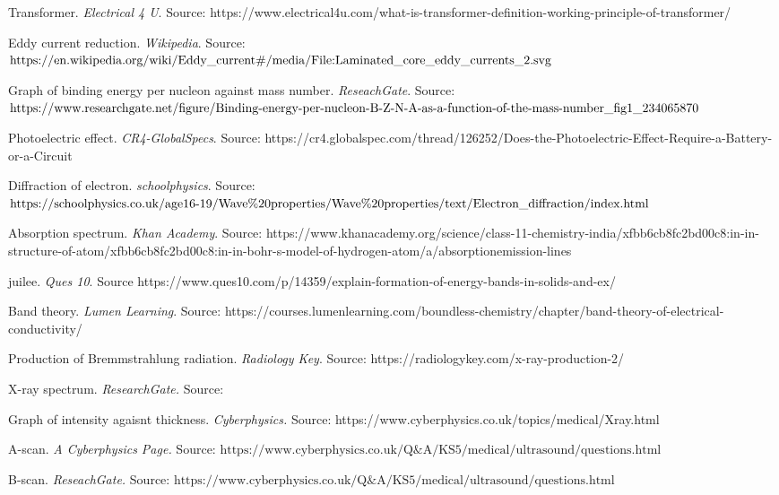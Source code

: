 \documentclass{article}
\begin{document}
\begin{flushleft}
Transformer. \textit{Electrical 4 U}. Source: https://www.electrical4u.com/what-is-transformer-definition-working-principle-of-transformer/

Eddy current reduction. \textit{Wikipedia}. Source: $\text{https://en.wikipedia.org/wiki/Eddy\textunderscore current\#/media/File:Laminated\textunderscore core\textunderscore eddy\textunderscore currents\textunderscore 2.svg}$

Graph of binding energy per nucleon against mass number. \textit{ReseachGate}. Source: $\text{https://www.researchgate.net/figure/Binding-energy-per-nucleon-B-Z-N-A-as-a-function-of-the-mass-number\textunderscore fig1\textunderscore 234065870}$


Photoelectric effect. \textit{CR4-GlobalSpecs}. Source: https://cr4.globalspec.com/thread/126252/Does-the-Photoelectric-Effect-Require-a-Battery-or-a-Circuit

Diffraction of electron. \textit{schoolphysics}. Source: $\text{https://schoolphysics.co.uk/age16-19/Wave\%20properties/Wave\%20properties/text/Electron\textunderscore diffraction/index.html}$

Absorption spectrum. \textit{Khan Academy}. Source: https://www.khanacademy.org/science/class-11-chemistry-india/xfbb6cb8fc2bd00c8:in-in-structure-of-atom/xfbb6cb8fc2bd00c8:in-in-bohr-s-model-of-hydrogen-atom/a/absorptionemission-lines


juilee. \textit{Ques 10}. Source https://www.ques10.com/p/14359/explain-formation-of-energy-bands-in-solids-and-ex/

Band theory. \textit{Lumen Learning}. Source: https://courses.lumenlearning.com/boundless-chemistry/chapter/band-theory-of-electrical-conductivity/

Production of Bremmstrahlung radiation. \textit{Radiology Key}. Source: https://radiologykey.com/x-ray-production-2/

X-ray spectrum. \textit{ResearchGate.} Source:



Graph of intensity agaisnt thickness. \textit{Cyberphysics.} Source: https://www.cyberphysics.co.uk/topics/medical/Xray.html

A-scan. \textit{A Cyberphysics Page.} Source: $\text{https://www.cyberphysics.co.uk/Q\&A/KS5/medical/ultrasound/questions.html}$

B-scan. \textit{ReseachGate.} Source: $\text{https://www.cyberphysics.co.uk/Q\&A/KS5/medical/ultrasound/questions.html}$


\end{flushleft}
\end{document}
